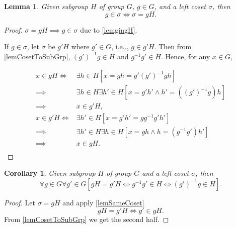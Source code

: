 \documentclass[12pt, letterpaper]{article}
\makeatletter
\newcommand\ie{i.e\@ifnextchar.{}{.\@}}
\newtheorem{lem}[prop]{Lemma}
\newtheorem{cor}[prop]{Corollary}
\theoremstyle{definition}
\theoremstyle{remark}
\theoremstyle{definition}
\theoremstyle{plain}
\numberwithin{equation}{section}
\makeatother
\begin{document}

	\begin{lem}\label{lemSameCoset}
		Given subgroup $H$ of group $G$, $g\in G$, and a left coset $\sigma$,
		then
		\[g\in \sigma\iff\sigma=gH. \]
	\end{lem}
	\begin{proof}
		$\sigma=gH\implies g\in\sigma$ due to \autoref{lemgingH}.
		
		If $g\in \sigma$, let $\sigma$ be $g'H$ where $g'\in G$,
		\ie, $g\in g'H$.
		Then from \autoref{lemCosetToSubGrp}, $(g')^{-1}g\in H$ and $g^{-1}g'\in H$.
		Hence, for any $x\in G$,
		
		\[ \begin{aligned}
			x\in gH \iff& \exists h\in H[x=gh=g'(g')^{-1}gh] \\
			\implies& \exists h \in H\exists h'\in H[x=g'h'\land h'=((g')^{-1}g)h]\\
			\implies &x\in g'H,\\
			x\in g'H\iff& \exists h'\in H[x=g'h'=gg^{-1}g'h'] \\
			\implies& \exists h' \in H\exists h\in H[x=gh\land h=(g^{-1}g')h']\\
			\implies &x\in gH.\\
		\end{aligned}\]
	\end{proof}

	\begin{cor}\label{lemgHg'H}
		Given subgroup $H$ of group $G$ and a left coset $\sigma$,
		then
		\[ \forall g\in G \forall g'\in G [gH=g'H\iff g^{-1}g'\in H\iff (g')^{-1}g\in H].\]
	\end{cor}
	\begin{proof}
		Let $\sigma=gH$ and apply \autoref{lemSameCoset}
		\[gH=g'H\iff g'\in gH.\]
		From \autoref{lemCosetToSubGrp} we get the second half.
	\end{proof}
\end{document}
